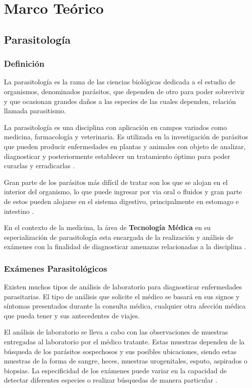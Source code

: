 \documentclass[letter,12pt]{report}
\begin{document}
\chapter{Marco Teórico}\label{teorico}

\section{Parasitología}
\subsection{Definición}
La parasitología es la rama de las ciencias biológicas dedicada a el estudio de
organismos, denominados parásitos, que dependen de otro para poder sobrevivir y que
ocasionan grandes daños a las especies de las cuales dependen, relación llamada
parasitismo.

La parasitología es una disciplina con aplicación en campos variados como medicina,
farmacología y veterinaria. Es utilizada en la investigación de parásitos que pueden
producir enfermedades en plantas y animales con objeto de analizar, diagnosticar y
posteriormente establecer un tratamiento óptimo para poder curarlas y
erradicarlas \cite{Paras}.

Gran parte de los parásitos más difícil de tratar son los que se alojan en el
interior del organismo, lo que puede ingresar por via oral o fluidos y gran parte de
estos pueden alojarse en el sistema digestivo, principalmente en estomago e
intestino \cite{Vigil}.

En el contexto de la medicina, la área de \textbf{Tecnología Médica} en su
especialización de parasitología esta encargada de la realización y análisis de
exámenes con la finalidad de diagnosticar amenazas relacionadas a la
disciplina \cite{Digest}.

\subsection{Exámenes Parasitológicos}

Existen muchos tipos de análisis de laboratorio para diagnosticar enfermedades parasitarias.
El tipo de análisis que solicite el médico se basará en sus signos y síntomas presentados
durante la consulta médica, cualquier otra afección médica que pueda tener y sus
antecedentes de viajes.

El análisis de laboratorio se lleva a cabo con las observaciones de muestras entregadas
al laboratorio por el médico tratante. Estas muestras dependen de la búsqueda de los
parásitos sospechosos y sus posibles ubicaciones, siendo estas muestras de la forma de
sangre, heces, muestras urogenitales, esputo, aspirados o biopsias. La especificidad de
los exámenes puede variar en la capacidad de detectar diferentes especies o realizar
búsquedas de manera particular \cite{Util}.
\end{document}
